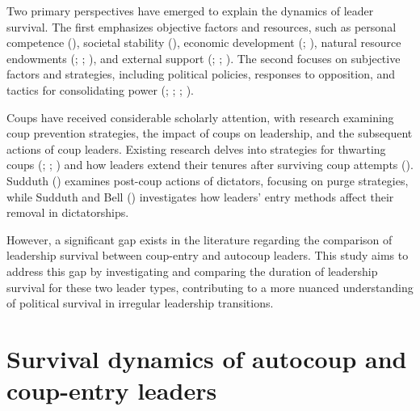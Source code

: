 \documentclass[
  12pt,
]{report}
\begin{document}
Two primary perspectives have emerged to explain the dynamics of leader
survival. The first emphasizes objective factors and resources, such as
personal competence (),
societal stability (), economic
development (;
), natural resource endowments
(;
;
), and
external support (;
; ). The second focuses on subjective factors and
strategies, including political policies, responses to opposition, and
tactics for consolidating power (; ;
;
).

Coups have received considerable scholarly attention, with research
examining coup prevention strategies, the impact of coups on leadership,
and the subsequent actions of coup leaders. Existing research delves
into strategies for thwarting coups (; ;
) and how leaders extend their
tenures after surviving coup attempts (). Sudduth () examines
post-coup actions of dictators, focusing on purge strategies, while
Sudduth and Bell () investigates how
leaders' entry methods affect their removal in dictatorships.

However, a significant gap exists in the literature regarding the
comparison of leadership survival between coup-entry and autocoup
leaders. This study aims to address this gap by investigating and
comparing the duration of leadership survival for these two leader
types, contributing to a more nuanced understanding of political
survival in irregular leadership transitions.

\section{Survival dynamics of autocoup and coup-entry
leaders}\label{survival-dynamics-of-autocoup-and-coup-entry-leaders}
\end{document}
